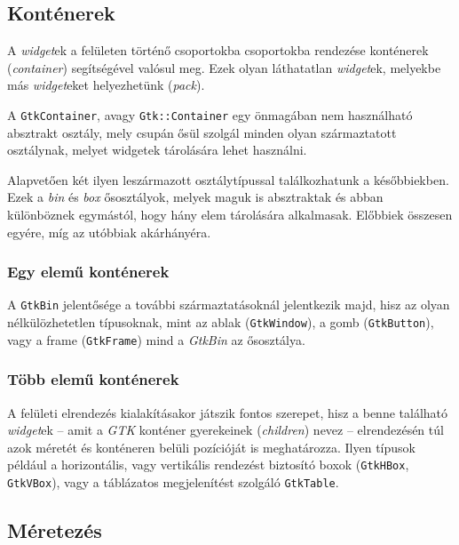 \documentclass[a4paper,10pt]{article}
\begin{document}
\subsection{Konténerek}

A \textit{widget}ek a felületen történő csoportokba csoportokba rendezése konténerek (\textit{container}) segítségével valósul meg. Ezek olyan láthatatlan \textit{widget}ek, melyekbe más \textit{widget}eket helyezhetünk (\textit{pack}).

A \texttt{GtkContainer}, avagy \texttt{Gtk::Container} egy önmagában nem használható absztrakt osztály, mely csupán ősül szolgál minden olyan származtatott osztálynak, melyet widgetek tárolására lehet használni.

Alapvetően két ilyen leszármazott osztálytípussal találkozhatunk a későbbiekben. Ezek a \textit{bin} és \textit{box} ősosztályok, melyek maguk is absztraktak és abban különböznek egymástól, hogy hány elem tárolására alkalmasak. Előbbiek összesen egyére, míg az utóbbiak akárhányéra.

\subsubsection{Egy elemű konténerek}

A \texttt{GtkBin} jelentősége a további származtatásoknál jelentkezik majd, hisz az olyan nélkülözhetetlen típusoknak, mint az ablak (\texttt{GtkWindow}), a gomb (\texttt{GtkButton}), vagy a frame (\texttt{GtkFrame}) mind a \textit{GtkBin} az ősosztálya.

\subsubsection{Több elemű konténerek}

A felületi elrendezés kialakításakor játszik fontos szerepet, hisz a benne található \textit{widget}ek -- amit a \textit{GTK} konténer gyerekeinek (\textit{children}) nevez -- elrendezésén túl azok méretét és konténeren belüli pozícióját is meghatározza. Ilyen típusok például a horizontális, vagy vertikális rendezést biztosító boxok (\texttt{GtkHBox}, \texttt{GtkVBox}), vagy a táblázatos megjelenítést szolgáló \texttt{GtkTable}.

\subsection{Méretezés}
\end{document}
